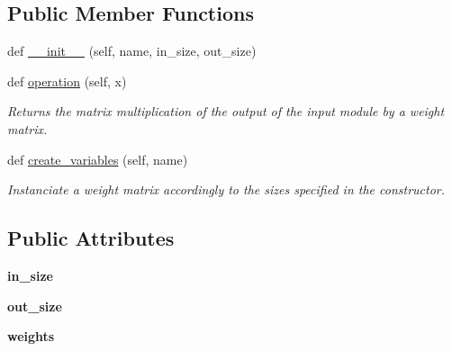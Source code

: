 \subsection*{Public Member Functions}
\begin{DoxyCompactItemize}
\item 
def \hyperlink{classmodules_1_1_fully_connected_module_afb394d5c031fef0fec0feeec80a54fae}{\+\_\+\+\_\+init\+\_\+\+\_\+} (self, name, in\+\_\+size, out\+\_\+size)
\item 
def \hyperlink{classmodules_1_1_fully_connected_module_adb0bf41ff737487804b75ee8bdd9a3b4}{operation} (self, x)
\begin{DoxyCompactList}\small\item\em Returns the matrix multiplication of the output of the input module by a weight matrix. \end{DoxyCompactList}\item 
\mbox{\label{classmodules_1_1_fully_connected_module_aafa7090b4a568168526c1782a1b9794f}} 
def \hyperlink{classmodules_1_1_fully_connected_module_aafa7090b4a568168526c1782a1b9794f}{create\+\_\+variables} (self, name)
\begin{DoxyCompactList}\small\item\em Instanciate a weight matrix accordingly to the sizes specified in the constructor. \end{DoxyCompactList}\end{DoxyCompactItemize}
\subsection*{Public Attributes}
\begin{DoxyCompactItemize}
\item 
\mbox{\label{classmodules_1_1_fully_connected_module_afae1920d4f8094b2bf20677b0e482d2b}} 
{\bfseries in\+\_\+size}
\item 
\mbox{\label{classmodules_1_1_fully_connected_module_abb15a67f0af437ffd177dc2f1c991632}} 
{\bfseries out\+\_\+size}
\item 
\mbox{\label{classmodules_1_1_fully_connected_module_ac622fa3065dc7fa896020fd950799480}} 
{\bfseries weights}
\end{DoxyCompactItemize}


